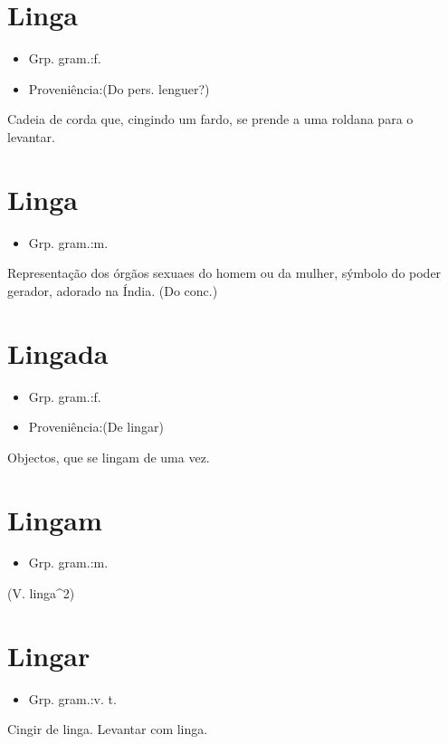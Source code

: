 \section{Linga}
\begin{itemize}
\item {Grp. gram.:f.}
\end{itemize}
\begin{itemize}
\item {Proveniência:(Do pers. \textunderscore lenguer\textunderscore ?)}
\end{itemize}
Cadeia de corda que, cingindo um fardo, se prende a uma roldana para o levantar.
\section{Linga}
\begin{itemize}
\item {Grp. gram.:m.}
\end{itemize}
Representação dos órgãos sexuaes do homem ou da mulher, sýmbolo do poder gerador, adorado na Índia.
(Do conc.)
\section{Lingada}
\begin{itemize}
\item {Grp. gram.:f.}
\end{itemize}
\begin{itemize}
\item {Proveniência:(De \textunderscore lingar\textunderscore )}
\end{itemize}
Objectos, que se lingam de uma vez.
\section{Lingam}
\begin{itemize}
\item {Grp. gram.:m.}
\end{itemize}
(V. \textunderscore linga\textunderscore ^2)
\section{Lingar}
\begin{itemize}
\item {Grp. gram.:v. t.}
\end{itemize}
Cingir de linga.
Levantar com linga.
